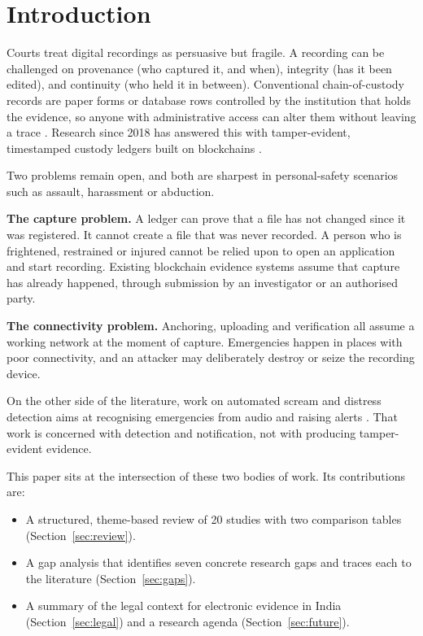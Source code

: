 \documentclass[conference,a4paper,10pt]{IEEEtran}
\begin{document}
\section{Introduction}
Courts treat digital recordings as persuasive but fragile. A recording can be challenged on provenance (who captured it, and when), integrity (has it been edited), and continuity (who held it in between). Conventional chain-of-custody records are paper forms or database rows controlled by the institution that holds the evidence, so anyone with administrative access can alter them without leaving a trace \cite{bonomi,ahmad}. Research since 2018 has answered this with tamper-evident, timestamped custody ledgers built on blockchains \cite{bonomi,sli,tian,ahmad,jeong,mli}.

Two problems remain open, and both are sharpest in personal-safety scenarios such as assault, harassment or abduction.

\textbf{The capture problem.} A ledger can prove that a file has not changed since it was registered. It cannot create a file that was never recorded. A person who is frightened, restrained or injured cannot be relied upon to open an application and start recording. Existing blockchain evidence systems assume that capture has already happened, through submission by an investigator or an authorised party.

\textbf{The connectivity problem.} Anchoring, uploading and verification all assume a working network at the moment of capture. Emergencies happen in places with poor connectivity, and an attacker may deliberately destroy or seize the recording device.

On the other side of the literature, work on automated scream and distress detection aims at recognising emergencies from audio and raising alerts \cite{bhad}. That work is concerned with detection and notification, not with producing tamper-evident evidence.

This paper sits at the intersection of these two bodies of work. Its contributions are:
\begin{itemize}
  \item[\textbf{C1.}] A structured, theme-based review of 20 studies with two comparison tables (Section~\ref{sec:review}).
  \item[\textbf{C2.}] A gap analysis that identifies seven concrete research gaps and traces each to the literature (Section~\ref{sec:gaps}).
  \item[\textbf{C3.}] A summary of the legal context for electronic evidence in India (Section~\ref{sec:legal}) and a research agenda (Section~\ref{sec:future}).
\end{itemize}
\end{document}

